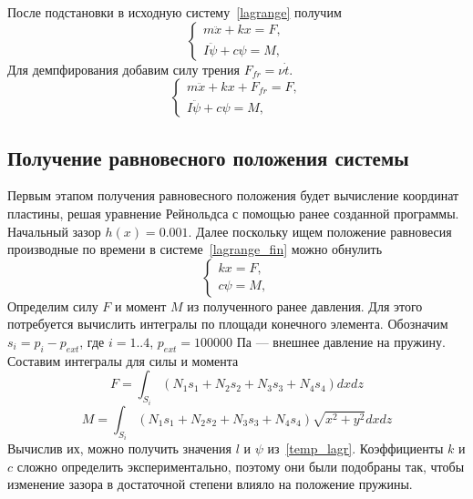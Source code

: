 \documentclass[a4paper,14pt]{extarticle}
\begin{document}
После подстановки в исходную систему~\eqref{lagrange} получим
\begin{equation*}
	\begin{cases*}
		m \ddot{x} + k x = F, \\
		I \ddot{\psi} + c \psi = M,
	\end{cases*}
\end{equation*}
Для демпфирования добавим силу трения $F_{fr} = \nu \dot{t}$.
\begin{equation}
	\begin{cases*}
		m \ddot{x} + k x + F_{fr} = F, \\
		I \ddot{\psi} + c \psi = M,
	\end{cases*}
	\label{lagrange_fin}
\end{equation}

\subsection{Получение равновесного положения системы}

Первым этапом получения равновесного положения будет вычисление координат пластины, решая уравнение Рейнольдса с помощью ранее созданной программы. Начальный зазор $h(x) = 0.001$.
Далее поскольку ищем положение равновесия производные по времени в системе~\eqref{lagrange_fin} можно обнулить
\begin{equation}
	\begin{cases*}
		k x = F, \\
		c \psi = M,
	\end{cases*}
\label{temp_lagr}
\end{equation}
Определим силу $F$ и момент $M$ из полученного ранее давления. Для этого потребуется вычислить интегралы по площади конечного элемента. Обозначим $s_i = p_i - p_{ext}$, где $i = 1..4$, $p_{ext} = 100000$ Па --- внешнее давление на пружину. Составим интегралы для силы и момента
\begin{equation*}
	F = \int_{S_i} { \left( N_1 s_1 + N_2 s_2 + N_3 s_3 + N_4 s_4 \right)  dx dz}
\end{equation*}
\begin{equation*}
	M = \int_{S_i} { \left( N_1 s_1 + N_2 s_2 + N_3 s_3 + N_4 s_4 \right) \sqrt{x^2 + y^2}  dx dz}
\end{equation*}
Вычислив их, можно получить значения $l$ и $\psi$ из~\eqref{temp_lagr}. Коэффициенты $k$ и $c$ сложно определить экспериментально, поэтому они были подобраны так, чтобы изменение зазора в достаточной степени влияло на положение пружины.
\end{document}
